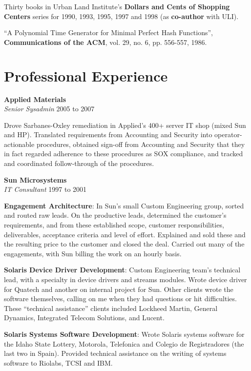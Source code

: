 \documentclass[12pt,margin,line]{res}
\newcommand{\internalskip}{\vspace{-.15in}}
\begin{document}
\begin{resume}
Thirty books in Urban Land Institute's 
{\bf Dollars and Cents of Shopping Centers}
series for 1990, 1993, 1995, 1997 and 1998
(as {\bf co-author}
with ULI).

``A Polynomial Time Generator for Minimal Perfect Hash Functions'',
{\bf Communications of the ACM},
vol.  29, no.  6, pp.  556-557, 1986.

\section{\sc Professional Experience}

{\bf Applied Materials} \\
{\em Senior Sysadmin} \hfill 2005 to 2007

\internalskip
\begin{sloppypar}
Drove Sarbanes-Oxley remediation in Applied's 400+ server IT shop
(mixed Sun and HP).
Translated requirements from Accounting and Security into operator-actionable
procedures, obtained sign-off from Accounting and Security that they in
fact regarded adherence to these procedures as SOX compliance, and tracked
and coordinated follow-through of the procedures.
\end{sloppypar}

{\bf Sun Microsystems} \\
{\em IT Consultant} \hfill 1997 to 2001

\internalskip
\begin{sloppypar}
{\bf\footnotesize Engagement Architecture}:
In Sun's small Custom Engineering group, sorted and routed raw leads.
On the productive leads, determined the customer's requirements, and from
these established scope, customer responsibilities, deliverables, acceptance
criteria and level of effort.
Explained and sold these and the resulting price to the customer and closed
the deal.
Carried out many of the engagements, with Sun billing the work on an hourly
basis.
\end{sloppypar}

\internalskip
{\bf\footnotesize Solaris Device Driver Development}:
Custom Engineering team's technical lead, with a specialty in device drivers
and streams modules.
Wrote device driver for Quatech and another on internal project for Sun.
Other clients wrote the software themselves, calling on me when they had
questions or hit difficulties.
These ``technical assistance''
clients included Lockheed Martin, General Dynamics, Integrated Telecom
Solutions, and Lucent.

\internalskip
{\footnotesize\bf Solaris Systems Software Development}:
Wrote Solaris systems software for the Idaho State Lottery, Motorola,
Telefonica and Colegio de Registradores (the last two in Spain).
Provided technical assistance on the writing of systems software to Riolabs,
TCSI and IBM.


\end{resume}
\end{document}
